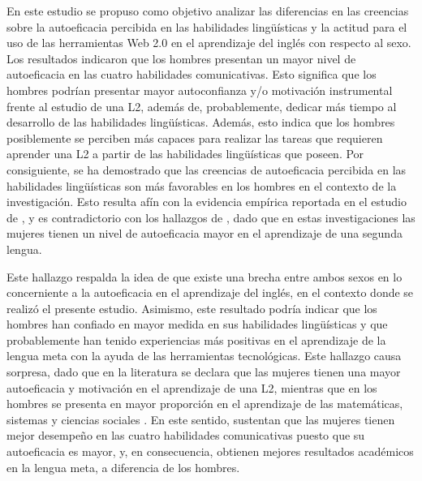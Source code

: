 \documentclass[spanish]{textolivre}
\begin{document}
En este estudio se propuso como objetivo analizar las diferencias en las creencias sobre la autoeficacia percibida en las habilidades lingüísticas y la actitud para el uso de las herramientas Web 2.0 en el aprendizaje del inglés con respecto al sexo. Los resultados indicaron que los hombres presentan un mayor nivel de autoeficacia en las cuatro habilidades comunicativas. Esto significa que los hombres podrían presentar mayor autoconfianza y/o motivación instrumental frente al estudio de una L2, además de, probablemente, dedicar más tiempo al desarrollo de las habilidades lingüísticas. Además, esto indica que los hombres posiblemente se perciben más capaces para realizar las tareas que requieren aprender una L2 a partir de las habilidades lingüísticas que poseen. Por consiguiente, se ha demostrado que las creencias de autoeficacia percibida en las habilidades lingüísticas son más favorables en los hombres en el contexto de la investigación. Esto resulta afín con la evidencia empírica reportada en el estudio de \textcite{csizer_gender-related_2024}, y es contradictorio con los hallazgos de \textcite{wang_self-efficacy_2013,abdelhafez_efl_2016,hasan_effect_2019,zhu_relationship_2020,nguyen_relationship_2022}, dado que en estas investigaciones las mujeres tienen un nivel de autoeficacia mayor en el aprendizaje de una segunda lengua. 

Este hallazgo respalda la idea de que existe una brecha entre ambos sexos en lo concerniente a la autoeficacia en el aprendizaje del inglés, en el contexto donde se realizó el presente estudio. Asimismo, este resultado podría indicar que los hombres han confiado en mayor medida en sus habilidades lingüísticas y que probablemente han tenido experiencias más positivas en el aprendizaje de la lengua meta con la ayuda de las herramientas tecnológicas. Este hallazgo causa sorpresa, dado que en la literatura se declara que las mujeres tienen una mayor autoeficacia y motivación en el aprendizaje de una L2, mientras que en los hombres se presenta en mayor proporción en el aprendizaje de las matemáticas, sistemas y ciencias sociales \cite{mwaura_gender_2021,nguyen_relationship_2022}. En este sentido, \textcite{zhu_relationship_2020,nguyen_relationship_2022} sustentan que las mujeres tienen mejor desempeño en las cuatro habilidades comunicativas puesto que su autoeficacia es mayor, y, en consecuencia, obtienen mejores resultados académicos en la lengua meta, a diferencia de los hombres. 
\end{document}
